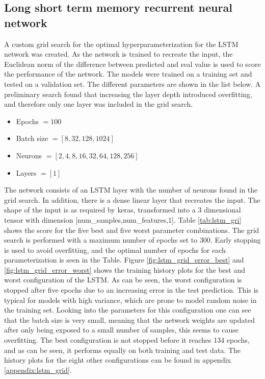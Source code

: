             \subsection{Long short term memory recurrent neural network}
                A custom grid search for the optimal hyperparameterization for the LSTM network was created. As the network is trained to recreate the input, the Euclidean norm of the difference between predicted and real value is used to score the performance of the network. The models were trained on a training set and tested on a validation set. The different parameters are shown in the list below. A preliminary search found that increasing the layer depth introduced overfitting, and therefore only one layer was included in the grid search.  
                \begin{itemize}
                    \item Epochs $= 100$
                    \item Batch size $=[8,32,128,1024]$
                    \item Neurons $= [2,4,8,16,32,64,128,256]$
                    \item Layers $= [1]$
                \end{itemize}
                The network consists of an LSTM layer with the number of neurons found in the grid search. In addition, there is a dense linear layer that recreates the input. The shape of the input is as required by keras, transformed into a 3 dimensional tensor with dimension [num\_samples,num\_features,1]. Table \ref{tab:lstm_gri} shows the score for the five best and five worst parameter combinations. The grid search is performed with a maximum number of epochs set to $300$. Early stopping is used to avoid overfitting, and the optimal number of epochs for each parameterization is seen in the Table. Figure \ref{fig:lstm_grid_error_best} and \ref{fig:lstm_grid_error_worst} shows the training history plots for the best and worst configuration of the LSTM. As can be seen, the worst configuration is stopped after five epochs due to an increasing error in the test prediction. This is typical for models with high variance, which are prone to model random noise in the training set. Looking into the parameters for this configuration one can see that the batch size is very small, meaning that the network weights are updated after only being exposed to a small number of samples, this seems to cause overfitting. The best configuration is not stopped before it reaches 134 epochs, and as can be seen, it performs equally on both training and test data. The history plots for the eight other configurations can be found in appendix \ref{appendix:lstm_grid}. 
                

